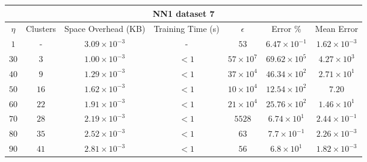 \begin{adjustwidth}{-1cm}{}
\begin{tabular}{ccccccc}
\hline
\multicolumn{7}{c}{NN1 dataset 7} \\
\toprule
$\eta$ & Clusters & Space Overhead (KB) & Training Time (s) & $\epsilon$ & Error \% & Mean Error\\
\midrule
$1$ & - & $3.09 \times 10^{-3}$ & - & $53$ & $6.47 \times 10^{-1}$ & $1.62 \times 10^{-3}$\\
$30$ & $3$ & $1.00 \times 10^{-3}$ & $<1$ & $57 \times 10^7$ & $69.62 \times 10^5$ & $4.27 \times 10^3$\\
$40$ & $9$ & $1.29 \times 10^{-3}$ & $<1$ & $37 \times 10^4$ & $46.34 \times 10^2$ & $2.71 \times 10^1$\\
$50$ & $16$ & $1.62 \times 10^{-3}$ & $<1$ & $10 \times 10^4$ & $12.54 \times 10^2$ & $7.20$\\
$60$ & $22$ & $1.91 \times 10^{-3}$ & $<1$ & $21 \times 10^4$ & $25.76 \times 10^2$ & $1.46 \times 10^1$\\
$70$ & $28$ & $2.19 \times 10^{-3}$ & $<1$ & $5528$ & $6.74  \times 10^1$ & $2.44 \times 10^{-1}$\\
$80$ & $35$ & $2.52 \times 10^{-3}$ & $<1$ & $63$ & $7.7 \times 10^{-1}$ & $2.26 \times 10^{-3}$\\
$90$ & $41$ & $2.81 \times 10^{-3}$ & $<1$ & $56$ & $6.8  \times 10^1$ & $1.82 \times 10^{-3}$\\
\bottomrule
\end{tabular}
\end{adjustwidth}

\par\null\par
\par\null\par

